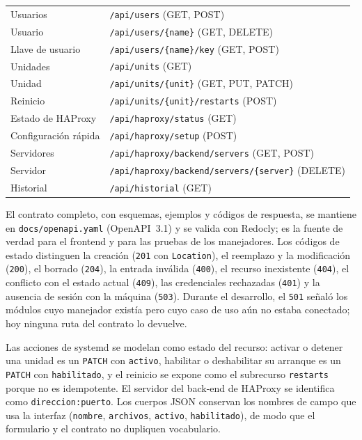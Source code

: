 \begin{table}[!t]
\begin{tabularx}{\columnwidth}{@{}l >{\raggedright\arraybackslash}X@{}}
    Usuarios & \texttt{/api/\allowbreak users} (GET, POST) \\
    Usuario & \texttt{/api/\allowbreak users/\allowbreak\{name\}} (GET, DELETE) \\
    Llave de usuario & \texttt{/api/\allowbreak users/\allowbreak\{name\}/\allowbreak key} (GET, POST) \\
    Unidades & \texttt{/api/\allowbreak units} (GET) \\
    Unidad & \texttt{/api/\allowbreak units/\allowbreak\{unit\}} (GET, PUT, PATCH) \\
    Reinicio & \texttt{/api/\allowbreak units/\allowbreak\{unit\}/\allowbreak restarts} (POST) \\
    Estado de HAProxy & \texttt{/api/\allowbreak haproxy/\allowbreak status} (GET) \\
    Configuración rápida & \texttt{/api/\allowbreak haproxy/\allowbreak setup} (POST) \\
    Servidores & \texttt{/api/\allowbreak haproxy/\allowbreak backend/\allowbreak servers} (GET, POST) \\
    Servidor & \texttt{/api/\allowbreak haproxy/\allowbreak backend/\allowbreak servers/\allowbreak\{server\}} (DELETE) \\
    Historial & \texttt{/api/\allowbreak historial} (GET) \\
    \hline
  \end{tabularx}
\end{table}

El contrato completo, con esquemas, ejemplos y códigos de respuesta, se
mantiene en \texttt{docs/openapi.yaml} (OpenAPI~3.1) y se valida con
Redocly; es la fuente de verdad para el frontend y para las pruebas de
los manejadores. Los códigos de estado distinguen la creación
(\texttt{201} con \texttt{Location}), el reemplazo y la modificación
(\texttt{200}), el borrado (\texttt{204}), la entrada inválida
(\texttt{400}), el recurso inexistente (\texttt{404}), el conflicto con
el estado actual (\texttt{409}), las credenciales rechazadas
(\texttt{401}) y la ausencia de sesión con la máquina
(\texttt{503}). Durante el desarrollo, el \texttt{501} señaló los
módulos cuyo manejador existía pero cuyo caso de uso aún no estaba
conectado; hoy ninguna ruta del contrato lo devuelve.

Las acciones de systemd se modelan como estado del recurso: activar o
detener una unidad es un \texttt{PATCH} con \texttt{activo}, habilitar
o deshabilitar su arranque es un \texttt{PATCH} con
\texttt{habilitado}, y el reinicio se expone como el subrecurso
\texttt{restarts} porque no es idempotente. El servidor del back-end de
HAProxy se identifica como \texttt{direccion:puerto}. Los cuerpos JSON
conservan los nombres de campo que usa la interfaz
(\texttt{nombre}, \texttt{archivos}, \texttt{activo},
\texttt{habilitado}), de modo que el formulario y el contrato no
dupliquen vocabulario.

